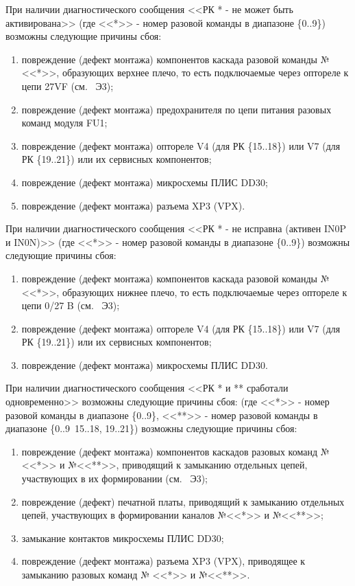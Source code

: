   \begin{sloppypar}
    \subpoint При наличии диагностического сообщения <<РК * - не может быть активирована>>
    	      (где <<*>> - номер разовой команды в диапазоне \{0..9\}) возможны следующие причины сбоя:
      \begin{enumerate}
	\item повреждение (дефект монтажа) компонентов каскада разовой команды № <<*>>, образующих верхнее плечо, 
	      то есть подключаемые через оптореле к цепи 27VF (см. \DocProductSignature~Э3);
	\item повреждение (дефект монтажа) предохранителя по цепи питания разовых команд модуля FU1;
	\item повреждение (дефект монтажа) оптореле V4 (для РК \{15..18\}) или V7 (для РК \{19..21\}) или их сервисных компонентов;
	\item повреждение (дефект монтажа) микросхемы ПЛИС DD30;
	\item повреждение (дефект монтажа) разъема XP3 (VPX).
      \end{enumerate}
      
      \subpoint При наличии диагностического сообщения <<РК * - не исправна (активен IN0P и IN0N)>> 
      	      (где <<*>> - номер разовой команды в диапазоне \{0..9\}) возможны следующие причины сбоя:
      \begin{enumerate}
	\item повреждение (дефект монтажа) компонентов каскада разовой команды № <<*>>, образующих нижнее плечо, 
	      то есть подключаемые через оптореле к цепи 0/27 B (см. \DocProductSignature~Э3);
	\item повреждение (дефект монтажа) оптореле V4 (для РК \{15..18\}) или V7 (для РК \{19..21\}) или их сервисных компонентов;
	\item повреждение (дефект монтажа) микросхемы ПЛИС DD30.
      \end{enumerate}
      
      \subpoint При наличии диагностического сообщения <<РК * и ** сработали одновременно>> возможны следующие причины сбоя:
	      (где <<*>> - номер разовой команды в диапазоне \{0..9\}, <<**>> - номер разовой команды в диапазоне \{0..9\, 15..18, 19..21\}) возможны следующие причины сбоя:
      \begin{enumerate}
	\item повреждение (дефект монтажа) компонентов каскадов разовых команд № <<*>> и №<<**>>, 
	      приводящий к замыканию отдельных цепей, участвующих в их формировании (см. \DocProductSignature~Э3);
	\item повреждение (дефект) печатной платы, приводящий к замыканию отдельных цепей, участвующих в формировании каналов №<<*>> и №<<**>>;
	\item замыкание контактов микросхемы ПЛИС DD30;
	\item повреждение (дефект монтажа) разъема XP3 (VPX), приводящее к замыканию разовых команд № <<*>> и №<<**>>.
      \end{enumerate}
      

\end{sloppypar}
